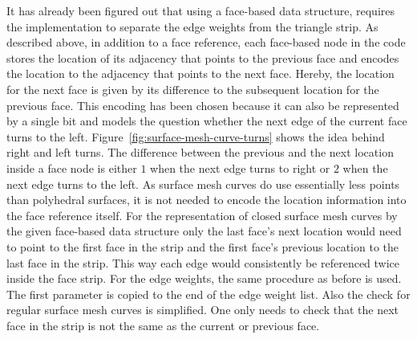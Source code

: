 \documentclass{stdlocal}
\begin{document}
  It has already been figured out that using a face-based data structure, requires the implementation to separate the edge weights from the triangle strip.
  As described above, in addition to a face reference, each face-based node in the code stores the location of its adjacency that points to the previous face and encodes the location to the adjacency that points to the next face.
  Hereby, the location for the next face is given by its difference to the subsequent location for the previous face.
  This encoding has been chosen because it can also be represented by a single bit and models the question whether the next edge of the current face turns to the left.
  Figure~\ref{fig:surface-mesh-curve-turns} shows the idea behind right and left turns.
  The difference between the previous and the next location inside a face node is either $1$ when the next edge turns to right or $2$ when the next edge turns to the left.
  As surface mesh curves do use essentially less points than polyhedral surfaces, it is not needed to encode the location information into the face reference itself.
  For the representation of closed surface mesh curves by the given face-based data structure only the last face's next location would need to point to the first face in the strip and the first face's previous location to the last face in the strip.
  This way each edge would consistently be referenced twice inside the face strip.
  For the edge weights, the same procedure as before is used.
  The first parameter is copied to the end of the edge weight list.
  Also the check for regular surface mesh curves is simplified.
  One only needs to check that the next face in the strip is not the same as the current or previous face.
\end{document}
